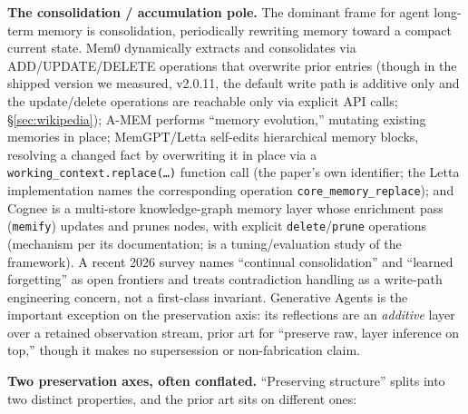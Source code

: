 \documentclass[11pt]{article}
\begin{document}
\textbf{The consolidation / accumulation pole.} The dominant frame for agent long-term memory is
consolidation, periodically rewriting memory toward a compact current state. Mem0
\citep{chhikara2025mem0} dynamically extracts and consolidates via ADD/UPDATE/DELETE operations that
overwrite prior entries (though in the shipped version we measured, v2.0.11, the default
write path is additive only and the update/delete operations are reachable only via explicit
API calls; \S\ref{sec:wikipedia}); A-MEM \citep{xu2025amem} performs ``memory evolution,'' mutating existing
memories in place; MemGPT/Letta \citep{packer2023memgpt} self-edits hierarchical memory blocks,
resolving a changed fact by overwriting it in place via a \texttt{working\_context.replace(\ldots)}
function call (the paper's own identifier; the Letta implementation names the corresponding
operation \texttt{core\_memory\_replace}); and Cognee
is a multi-store knowledge-graph memory layer whose enrichment pass (\texttt{memify}) updates and
prunes nodes, with explicit \texttt{delete}/\texttt{prune} operations (mechanism per its documentation;
\citep{markovic2025cognee} is a tuning/evaluation study of the framework). A recent 2026 survey
\citep{du2026survey} names ``continual consolidation'' and ``learned forgetting'' as open frontiers and
treats contradiction handling as a write-path engineering concern, not a first-class
invariant. Generative Agents \citep{park2023generative} is the
important exception on the preservation axis: its reflections are an \emph{additive} layer over a
retained observation stream, prior art for ``preserve raw, layer inference on top,'' though it
makes no supersession or non-fabrication claim.

\textbf{Two preservation axes, often conflated.} ``Preserving structure'' splits into two distinct
properties, and the prior art sits on different ones:
\end{document}
